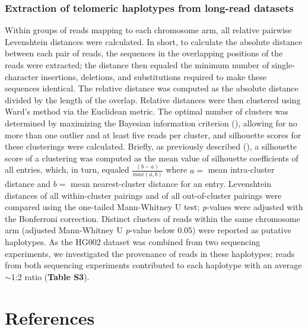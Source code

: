 \documentclass{article}
\newcommand{\citep}[1]{(\cite{#1})}
\begin{document}
\subsubsection*{Extraction of telomeric haplotypes from long-read datasets}
Within groups of reads mapping to each chromosome arm, all relative pairwise Levenshtein distances were calculated.
In short, to calculate the absolute distance between each pair of reads, the sequences in the overlapping positions of the reads were extracted; the distance then equaled the minimum number of single-character insertions, deletions, and substitutions required to make these sequences identical.
The relative distance was computed as the absolute distance divided by the length of the overlap.
Relative distances were then clustered using Ward's method via the Euclidean metric.
The optimal number of clusters was determined by maximizing the Bayesian information criterion \citep{bic}, allowing for no more than one outlier and at least five reads per cluster, and silhouette scores for these clusterings were calculated.
Briefly, as previously described \citep{silhouette}, a silhouette score of a clustering was computed as the mean value of silhouette coefficients of all entries, which, in turn, equaled $ \frac{(b - a)}{max(a, b)} $ where $ a = $ {\rmfamily mean intra-cluster distance} and $ b = $ {\rmfamily mean nearest-cluster distance} for an entry.
Levenshtein distances of all within-cluster pairings and of all out-of-cluster pairings were compared using the one-tailed Mann-Whitney U test; \textit{p}-values were adjusted with the Bonferroni correction.
Distinct clusters of reads within the same chromosome arm (adjusted Mann-Whitney U \textit{p}-value below 0.05) were reported as putative haplotypes.
As the HG002 dataset was combined from two sequencing experiments, we investigated the provenance of reads in these haplotypes; reads from both sequencing experiments contributed to each haplotype with an average $\sim$1:2 ratio (\textbf{Table S3}).

\section*{References} 
\begingroup \raggedright \singlespacing \printbibliography[heading=none] \endgroup
\end{document}
